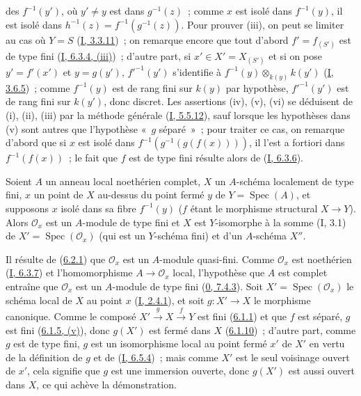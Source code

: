 
des $f^{-1}(y')$, où $y'\neq y$ est dans $g^{-1}(z)$~; comme $x$ est isolé
dans $f^{-1}(y)$, il est isolé dans
$h^{-1}(z)=f^{-1}(g^{-1}(z))$. Pour prouver (iii), on peut se limiter au cas
où $Y=S$ (\hyperref[I.3.3.11-fr]{I, 3.3.11})~; on remarque encore que tout
d'abord $f'=f_{(S')}$ est de type fini
(\hyperref[I.6.3.4-fr]{I, 6.3.4, (iii)})~; d'autre part, si
$x'\in X'=X_{(S')}$ et si on pose $y'=f'(x')$ et $y=g(y')$,
$f'^{-1}(y')$ s'identifie à
$f^{-1}(y)\otimes_{k(y)}k(y')$ (\hyperref[I.3.6.5-fr]{I, 3.6.5})~; comme
$f^{-1}(y)$ est de rang fini sur $k(y)$ par hypothèse, $f'^{-1}(y')$ est de
rang fini sur $k(y')$, donc discret. Les assertions (iv), (v), (vi) se
déduisent de (i), (ii), (iii) par la méthode générale
(\hyperref[I.5.5.12-fr]{I, 5.5.12}), sauf lorsque les hypothèses dans (v) sont
autres que l'hypothèse «~$g$ séparé~»~; pour traiter ce cas, on remarque
d'abord que si $x$ est isolé dans
$f^{-1}(g^{-1}(g(f(x))))$, il l'est a fortiori dans $f^{-1}(f(x))$~; le fait
que $f$ est de type fini résulte alors de
(\hyperref[I.6.3.6-fr]{I, 6.3.6}).

\begin{proposition}[6.2.5]
\label{II.6.2.5-fr}
Soient $A$ un anneau local noethérien complet, $X$ un $A$-schéma localement
de type fini, $x$ un point de $X$ au-dessus du point fermé $y$ de
$Y=\operatorname{Spec}(A)$, et supposons $x$ isolé dans sa fibre
$f^{-1}(y)$ ($f$ étant le morphisme structural $X\to Y$). Alors
$\mathcal{O}_x$ est un $A$-module de type fini et $X$ est $Y$-isomorphe à la
somme (I, 3.1) de
$X'=\operatorname{Spec}(\mathcal{O}_x)$ (qui est un $Y$-schéma fini) et d'un
$A$-schéma $X''$.
\end{proposition}

Il résulte de (\hyperref[II.6.2.1-fr]{6.2.1}) que $\mathcal{O}_x$ est un
$A$-module quasi-fini. Comme $\mathcal{O}_x$ est noethérien
(\hyperref[I.6.3.7-fr]{I, 6.3.7}) et l'homomorphisme
$A\to\mathcal{O}_x$ local, l'hypothèse que $A$ est complet entraîne que
$\mathcal{O}_x$ est un $A$-module de type fini
(\hyperref[0.7.4.3-fr]{0, 7.4.3}). Soit
$X'=\operatorname{Spec}(\mathcal{O}_x)$ le schéma local de $X$ au point $x$
(\hyperref[I.2.4.1-fr]{I, 2.4.1}), et soit $g:X'\to X$ le morphisme
canonique. Comme le composé $X'\xrightarrow{g}X\xrightarrow{f}Y$ est fini
(\hyperref[II.6.1.1-fr]{6.1.1}) et que $f$ est séparé, $g$ est fini
(\hyperref[II.6.1.5-fr]{6.1.5, (v)}), donc $g(X')$ est fermé dans $X$
(\hyperref[II.6.1.10-fr]{6.1.10})~; d'autre part, comme $g$ est de type fini,
$g$ est un isomorphisme local au point fermé $x'$ de $X'$ en vertu de la
définition de $g$ et de (\hyperref[I.6.5.4-fr]{I, 6.5.4})~; mais comme $X'$
est le seul voisinage ouvert de $x'$, cela signifie que $g$ est une immersion
ouverte, donc $g(X')$ est aussi ouvert dans $X$, ce qui achève la
démonstration.

